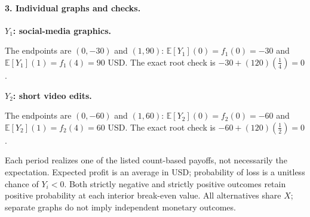 \clearpage\paragraph{3. Individual graphs and checks.}
\textbf{$Y_1$: social-media graphics.}
\begin{center}\end{center}
The endpoints are $(0,-30)$ and $(1,90)$: $\mathbb E[Y_1](0)=f_1(0)=-30$ and
$\mathbb E[Y_1](1)=f_1(4)=90$ USD.
The exact root check is $-30+(120)(\frac{1}{4})=0$.
\par\medskip
\textbf{$Y_2$: short video edits.}
\begin{center}\end{center}
The endpoints are $(0,-60)$ and $(1,60)$: $\mathbb E[Y_2](0)=f_2(0)=-60$ and
$\mathbb E[Y_2](1)=f_2(4)=60$ USD.
The exact root check is $-60+(120)(\frac{1}{2})=0$.
\par\medskip
Each period realizes one of the listed count-based payoffs, not necessarily the expectation.
Expected profit is an average in USD; probability of loss is a unitless chance of $Y_i<0$.
Both strictly negative and strictly positive outcomes retain positive probability at each interior break-even value.
All alternatives share $X$; separate graphs do not imply independent monetary outcomes.
\clearpage
